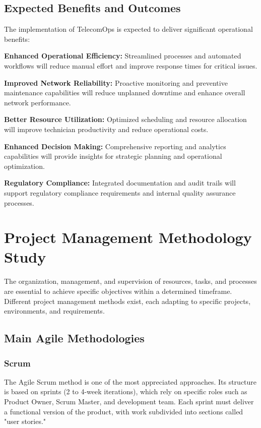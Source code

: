 \subsection{Expected Benefits and Outcomes}

The implementation of TelecomOps is expected to deliver significant operational benefits:

\textbf{Enhanced Operational Efficiency:} Streamlined processes and automated workflows will reduce manual effort and improve response times for critical issues.

\textbf{Improved Network Reliability:} Proactive monitoring and preventive maintenance capabilities will reduce unplanned downtime and enhance overall network performance.

\textbf{Better Resource Utilization:} Optimized scheduling and resource allocation will improve technician productivity and reduce operational costs.

\textbf{Enhanced Decision Making:} Comprehensive reporting and analytics capabilities will provide insights for strategic planning and operational optimization.

\textbf{Regulatory Compliance:} Integrated documentation and audit trails will support regulatory compliance requirements and internal quality assurance processes.

\section{Project Management Methodology Study}

The organization, management, and supervision of resources, tasks, and processes are essential to achieve specific objectives within a determined timeframe. Different project management methods exist, each adapting to specific projects, environments, and requirements.

\subsection{Main Agile Methodologies}

\subsubsection{Scrum}

The Agile Scrum method is one of the most appreciated approaches. Its structure is based on sprints (2 to 4-week iterations), which rely on specific roles such as Product Owner, Scrum Master, and development team. Each sprint must deliver a functional version of the product, with work subdivided into sections called "user stories."

